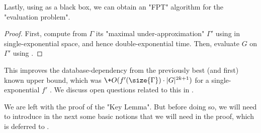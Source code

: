 Lastly, using  as a black box, we can obtain an "FPT" algorithm
for the "evaluation problem".
\fptEvalBoundedSemTreeWidth
\begin{proof}
	First, compute from $\Gamma$ its "maximal under-approximation" $\Gamma'$ using
	in single-exponential space, and hence double-exponential time.
	Then, evaluate $G$ on $\Gamma'$ using .
\end{proof}
This improves the database-dependency from the previously best (and first) known upper bound, which was $\+O(f'(\size{\Gamma})\cdot |G|^{2k+1})$ for a single-exponential $f'$ \cite[Theorem IV.11 \& Lemma IV.13]{DBLP:conf/lics/0001BV17}.
We discuss open questions related to this
in .


We are left with the proof of the "Key Lemma". But before doing so, we will need to introduce in the next  some basic notions that we will need in the proof, which is deferred to .